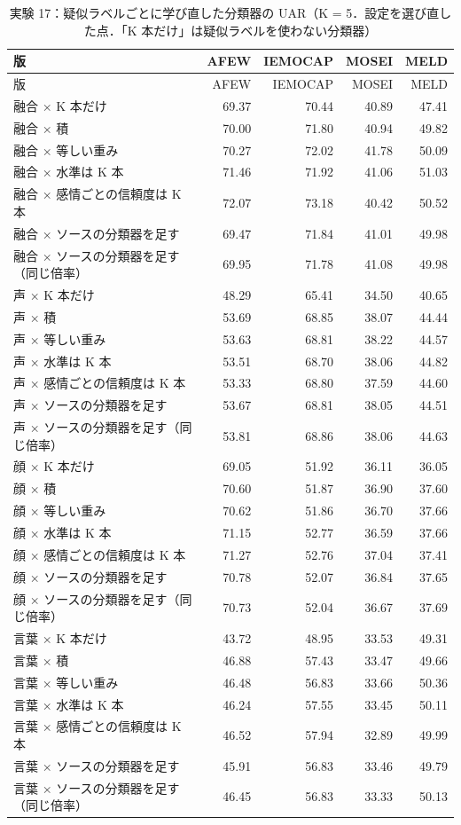 \begin{longtable}{>{\raggedright}p{8.2cm}rrrr}
\caption{実験 17：疑似ラベルごとに学び直した分類器の UAR（K = 5．設定を選び直した点．「K 本だけ」は疑似ラベルを使わない分類器）}\\
\toprule
版 & AFEW & IEMOCAP & MOSEI & MELD \\
\midrule
\endfirsthead
\toprule
版 & AFEW & IEMOCAP & MOSEI & MELD \\
\midrule
\endhead
\bottomrule
\endfoot

融合 × K 本だけ & 69.37 & 70.44 & 40.89 & 47.41 \\
融合 × 積 & 70.00 & 71.80 & 40.94 & 49.82 \\
融合 × 等しい重み & 70.27 & 72.02 & 41.78 & 50.09 \\
融合 × 水準は K 本 & 71.46 & 71.92 & 41.06 & 51.03 \\
融合 × 感情ごとの信頼度は K 本 & 72.07 & 73.18 & 40.42 & 50.52 \\
融合 × ソースの分類器を足す & 69.47 & 71.84 & 41.01 & 49.98 \\
融合 × ソースの分類器を足す（同じ倍率） & 69.95 & 71.78 & 41.08 & 49.98 \\
\midrule
声 × K 本だけ & 48.29 & 65.41 & 34.50 & 40.65 \\
声 × 積 & 53.69 & 68.85 & 38.07 & 44.44 \\
声 × 等しい重み & 53.63 & 68.81 & 38.22 & 44.57 \\
声 × 水準は K 本 & 53.51 & 68.70 & 38.06 & 44.82 \\
声 × 感情ごとの信頼度は K 本 & 53.33 & 68.80 & 37.59 & 44.60 \\
声 × ソースの分類器を足す & 53.67 & 68.81 & 38.05 & 44.51 \\
声 × ソースの分類器を足す（同じ倍率） & 53.81 & 68.86 & 38.06 & 44.63 \\
\midrule
顔 × K 本だけ & 69.05 & 51.92 & 36.11 & 36.05 \\
顔 × 積 & 70.60 & 51.87 & 36.90 & 37.60 \\
顔 × 等しい重み & 70.62 & 51.86 & 36.70 & 37.66 \\
顔 × 水準は K 本 & 71.15 & 52.77 & 36.59 & 37.66 \\
顔 × 感情ごとの信頼度は K 本 & 71.27 & 52.76 & 37.04 & 37.41 \\
顔 × ソースの分類器を足す & 70.78 & 52.07 & 36.84 & 37.65 \\
顔 × ソースの分類器を足す（同じ倍率） & 70.73 & 52.04 & 36.67 & 37.69 \\
\midrule
言葉 × K 本だけ & 43.72 & 48.95 & 33.53 & 49.31 \\
言葉 × 積 & 46.88 & 57.43 & 33.47 & 49.66 \\
言葉 × 等しい重み & 46.48 & 56.83 & 33.66 & 50.36 \\
言葉 × 水準は K 本 & 46.24 & 57.55 & 33.45 & 50.11 \\
言葉 × 感情ごとの信頼度は K 本 & 46.52 & 57.94 & 32.89 & 49.99 \\
言葉 × ソースの分類器を足す & 45.91 & 56.83 & 33.46 & 49.79 \\
言葉 × ソースの分類器を足す（同じ倍率） & 46.45 & 56.83 & 33.33 & 50.13 \\
\midrule
\end{longtable}
